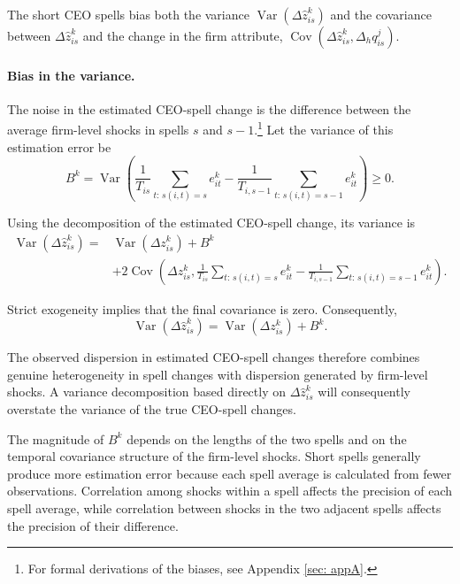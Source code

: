 \documentclass[11pt,a4paper]{article}
\begin{document}
The short CEO spells bias both the variance $\operatorname{Var}\!\left(
\Delta\widehat z_{is}^{k} \right)$ and the covariance between $\Delta\widehat z_{is}^{k}$ and the change in the firm attribute, $\operatorname{Cov}\!\left(\Delta\widehat z_{is}^{k},\Delta_h q_{is}^{j}\right)$.
\vspace{.2cm}

\paragraph{Bias in the variance.} The noise in the estimated CEO-spell change is the difference between the average firm-level shocks in spells $s$ and $s-1$.\footnote{For formal derivations of the biases, see Appendix \ref{sec: appA}.} Let the variance
of this estimation error be
\begin{equation}
B^{k}
=
\operatorname{Var}\!\left(
\frac{1}{T_{is}}
\sum_{t:\,s(i,t)=s} e_{it}^{k}
-
\frac{1}{T_{i,s-1}}
\sum_{t:\,s(i,t)=s-1} e_{it}^{k}
\right)
\geq 0.
\label{eq:B_definition}
\end{equation}

Using the decomposition of the estimated CEO-spell change, its variance
is
\begin{align}
\operatorname{Var}\!\left(
\Delta\widehat z_{is}^{k}
\right)
={}&
\operatorname{Var}\!\left(
\Delta z_{is}^{k}
\right)
+
B^{k}
\nonumber\\
&+
2\operatorname{Cov}\!\left(
\Delta z_{is}^{k},
\frac{1}{T_{is}}
\sum_{t:\,s(i,t)=s} e_{it}^{k}
-
\frac{1}{T_{i,s-1}}
\sum_{t:\,s(i,t)=s-1} e_{it}^{k}
\right).
\label{eq:variance_decomposition}
\end{align}

Strict exogeneity implies that the final covariance is zero.
Consequently,
\begin{equation}
\operatorname{Var}\!\left(
\Delta\widehat z_{is}^{k}
\right)
=
\operatorname{Var}\!\left(
\Delta z_{is}^{k}
\right)
+
B^{k}.
\label{eq:variance_bias}
\end{equation}

The observed dispersion in estimated CEO-spell changes therefore
combines genuine heterogeneity in spell changes with dispersion
generated by firm-level shocks. A variance decomposition based directly
on $\Delta\widehat z_{is}^{k}$ will consequently overstate the variance
of the true CEO-spell changes.

The magnitude of $B^{k}$ depends on the lengths of the two spells and
on the temporal covariance structure of the firm-level shocks. Short
spells generally produce more estimation error because each spell
average is calculated from fewer observations. Correlation among shocks
within a spell affects the precision of each spell average, while
correlation between shocks in the two adjacent spells affects the
precision of their difference.
\end{document}
